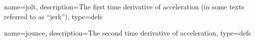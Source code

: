 
{%
	name=jolt,
	description=The first time derivative of acceleration (in some texts referred to as ``jerk''),
	type=defs
}

{%
	name=jounce,
	description=The second time derivative of acceleration,
	type=defs
}
